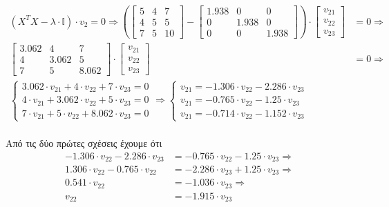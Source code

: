 \documentclass{article}
\begin{document}
	\begin{align*}
		(X^TX - λ \cdot \mathbb{I}) \cdot v_{2} = 0 \Rightarrow
		\left(	
		\begin{bmatrix}
			5 & 4 & 7 \\
			4 & 5 & 5 \\
			7 & 5 & 10 
		\end{bmatrix} - 
		\begin{bmatrix}
			1.938 & 0 & 0 \\
			0 & 1.938 & 0 \\
			0 & 0 & 1.938
		\end{bmatrix}
		\right) 
		\cdot
		\begin{bmatrix}
			v_{21} \\
			v_{22} \\
			v_{23}
		\end{bmatrix} &= 0 \Rightarrow\\	
		\begin{bmatrix}
			3.062 & 4 & 7 \\
			4 & 3.062 & 5 \\
			7 & 5 & 8.062 
		\end{bmatrix}
		\cdot
		\begin{bmatrix}
			v_{21} \\
			v_{22} \\
			v_{23}
		\end{bmatrix} &= 0 \Rightarrow\\
		\begin{cases}
			3.062 \cdot v_{21} + 4 \cdot v_{22} + 7 \cdot v_{23} = 0 \\
			4 \cdot v_{21} + 3.062 \cdot v_{22} + 5 \cdot v_{23} = 0 \\
			7 \cdot v_{21} + 5 \cdot v_{22} + 8.062 \cdot v_{23} = 0 
		\end{cases} \Rightarrow 
		\begin{cases}
			v_{21} = -1.306 \cdot v_{22} - 2.286 \cdot v_{23} \\
			v_{21} = -0.765 \cdot v_{22} - 1.25 \cdot v_{23} \\
			v_{21} = -0.714 \cdot v_{22} - 1.152 \cdot v_{23} 
		\end{cases}
	\end{align*}
	\\
	\noindent
	Aπό τις δύο πρώτες σχέσεις έχουμε ότι
	\begin{align*}	
		-1.306 \cdot v_{22} - 2.286 \cdot v_{23} &= -0.765 \cdot v_{22} - 1.25 \cdot v_{23} \Rightarrow \\
		1.306 \cdot v_{22} - 0.765 \cdot v_{22} &= - 2.286 \cdot v_{23} + 1.25 \cdot v_{23} \Rightarrow \\
		0.541 \cdot v_{22} &= -1.036 \cdot v_{23} \Rightarrow \\
		v_{22} &= -1.915 \cdot v_{23}
	\end{align*}
	
\end{document}
